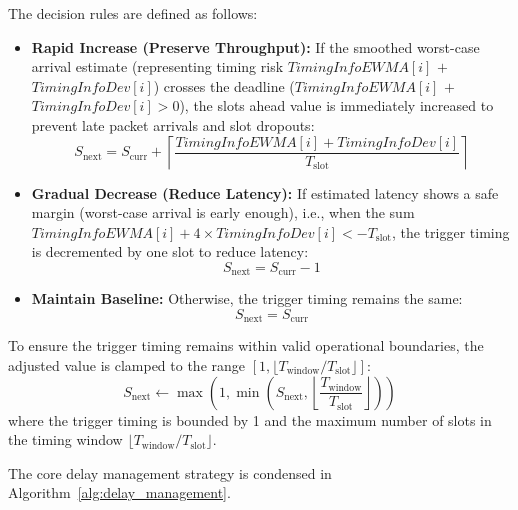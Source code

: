 \documentclass[../my_ntust_thesis.tex]{subfiles}
\begin{document}
The decision rules are defined as follows:
\begin{itemize}
    \item \textbf{Rapid Increase (Preserve Throughput):} If the smoothed worst-case arrival estimate (representing timing risk $\mathit{TimingInfoEWMA}[i]$ $+$ $\mathit{TimingInfoDev}[i]$) crosses the deadline ($\mathit{TimingInfoEWMA}[i]$ $+$ $\mathit{TimingInfoDev}[i] > 0$), the slots ahead value is immediately increased to prevent late packet arrivals and slot dropouts:
          \begin{equation}
          S_{\mathrm{next}} = S_{\mathrm{curr}} + \left\lceil \frac{\mathit{TimingInfoEWMA}[i] + \mathit{TimingInfoDev}[i]}{T_{\mathrm{slot}}} \right\rceil
          \end{equation}
    \item \textbf{Gradual Decrease (Reduce Latency):} If estimated latency shows a safe margin (worst-case arrival is early enough), i.e., when the sum $\mathit{TimingInfoEWMA}[i] + 4 \times \mathit{TimingInfoDev}[i] < -T_{\mathrm{slot}}$, the trigger timing is decremented by one slot to reduce latency:
          \begin{equation}
          S_{\mathrm{next}} = S_{\mathrm{curr}} - 1
          \end{equation}
    \item \textbf{Maintain Baseline:} Otherwise, the trigger timing remains the same:
          \begin{equation}
          S_{\mathrm{next}} = S_{\mathrm{curr}}
          \end{equation}
\end{itemize}
To ensure the trigger timing remains within valid operational boundaries, the adjusted value is clamped to the range $[1, \lfloor T_{\mathrm{window}} / T_{\mathrm{slot}} \rfloor]$:
\begin{equation}
S_{\mathrm{next}} \gets \max\left(1, \min\left(S_{\mathrm{next}}, \left\lfloor \frac{T_{\mathrm{window}}}{T_{\mathrm{slot}}} \right\rfloor \right)\right)
\end{equation}
where the trigger timing is bounded by 1 and the maximum number of slots in the timing window $\lfloor T_{\mathrm{window}} / T_{\mathrm{slot}} \rfloor$.

The core delay management strategy is condensed in Algorithm~\ref{alg:delay_management}.
\end{document}
